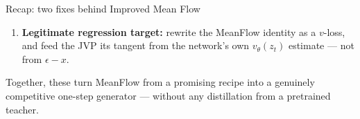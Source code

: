 \documentclass{beamer}
\begin{document}
\begin{frame}{Recap: two fixes behind Improved Mean Flow}
\begin{enumerate}
\item \textbf{Legitimate regression target:} rewrite the MeanFlow identity as a $v$-loss, and feed the JVP its tangent from the network's own $v_\theta(z_t)$ estimate --- not from $\epsilon-x$.
\end{enumerate}
\vspace{0.5em}
Together, these turn MeanFlow from a promising recipe into a genuinely competitive one-step generator --- without any distillation from a pretrained teacher.
\end{frame}
\end{document}
